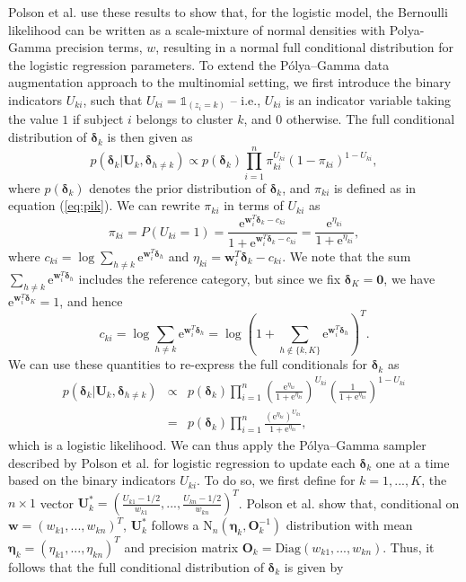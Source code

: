 \documentclass[useAMS,referee]{biom}
\begin{document}
Polson et al. use these results to show that, for the logistic model, the Bernoulli likelihood can be written as a scale-mixture of normal densities with Polya-Gamma precision terms, $w$, resulting in a normal full conditional distribution for the logistic regression parameters. To extend the P\'olya--Gamma data augmentation approach to the multinomial setting, we first introduce the binary indicators $U_{ki}$, such that $U_{ki} = \mathds{1}_{(z_i = k)}$ -- i.e., $U_{ki}$ is an indicator variable taking the value $1$ if subject $i$ belongs to cluster $k$, and $0$ otherwise. The full conditional distribution of $\boldsymbol\delta_k$ is then given as  $$p(\boldsymbol\delta_k|\mathbf{U}_k,\boldsymbol\delta_{h \ne k}) \propto p(\boldsymbol\delta_k) \prod_{i = 1}^{n} \pi_{ki}^{U_{ki}}(1-\pi_{ki})^{1-U_{ki}},$$
where $p(\boldsymbol\delta_k)$ denotes the prior distribution of $\boldsymbol\delta_k$, and $\pi_{ki}$ is defined as in equation (\ref{eq:pik}). We can rewrite $\pi_{ki}$ in terms of $U_{ki}$ as
$$\pi_{ki} = P(U_{ki} = 1) = \frac{\text{e}^{\mathbf{w}_i^T \boldsymbol\delta_k - {c}_{ki}}}{1 + \text{e}^{\mathbf{w}_i^T \boldsymbol\delta_k - {c}_{ki}}} = \frac{\text{e}^{\eta_{ki}}}{1 + \text{e}^{\eta_{ki}}},$$
where ${c}_{ki} = \log \sum_{h \ne k} \text{e}^{\mathbf{w}_i^T \boldsymbol\delta_{h}}$ and $\eta_{ki} = \mathbf{w}_i^T \boldsymbol\delta_k - {c}_{ki}$. We note that the sum $\sum_{h \ne k} \text{e}^{\mathbf{w}_i^T \boldsymbol\delta_{h}}$ includes the reference category, but since we fix $\boldsymbol\delta_K = \mathbf{0}$, we have $\text{e}^{\mathbf{w}_i^T \boldsymbol\delta_K} = 1$, and hence
$$c_{ki} = \log \sum_{h \ne k} \text{e}^{\mathbf{w}_i^T \boldsymbol\delta_{h}} = \log \left ( 1 + \sum_{h \notin \{k,K \}} \text{e}^{\mathbf{w}_i^T \boldsymbol\delta_{h}} \right )^T.$$
We can use these quantities to re-express the full conditionals for $\boldsymbol\delta_k$ as
\begin{eqnarray}
	p(\boldsymbol\delta_k|\mathbf{U}_k,\boldsymbol\delta_{h \ne k}) &\propto& p(\boldsymbol\delta_k) \prod_{i = 1}^{n} \left (\frac{\text{e}^{\eta_{ki}}}{1 + \text{e}^{\eta_{ki}}} \right )^{U_{ki}} \left (\frac{1}{1 + \text{e}^{\eta_{ki}}} \right )^{1-U_{ki}} \nonumber\\ &=& p(\boldsymbol\delta_k) \prod_{i = 1}^n \frac{(\text{e}^{\eta_{ki}})^{U_{ki}}}{1 + \text{e}^{\eta_{ki}}}, \label{eq:pglogit}
\end{eqnarray}
which is a logistic likelihood. We can thus apply the P\'olya--Gamma sampler described by Polson et al. for logistic regression to update each $\boldsymbol\delta_k$ one at a time based on the binary indicators $U_{ki}$. To do so, we first define for $k = 1,...,K$, the $n \times 1$ vector $\mathbf{U}^*_{k} = \left( \frac{U_{k1}-1/2}{w_{k1}},...,\frac{U_{kn}-1/2}{w_{kn}} \right )^T$. Polson et al. show that, conditional on $\boldsymbol{w} = (w_{k1},...,w_{kn})^T$, $\mathbf{U}^*_{k}$ follows a $\text{N}_n (\boldsymbol\eta_k,\mathbf{O}_k^{-1})$ distribution with mean $\boldsymbol\eta_k = (\eta_{k1},...,\eta_{kn})^T$ and precision matrix $\mathbf{O}_k = \text{Diag}(w_{k1},...,w_{kn})$. Thus, it follows that the full conditional distribution of $\boldsymbol\delta_k$ is given by 
\end{document}
